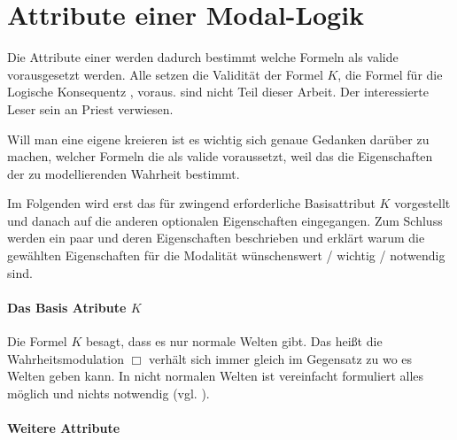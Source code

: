 

\section{Attribute einer Modal-Logik} %
\label{sub:attribute_einer_modal_logik}
Die Attribute einer \ML werden dadurch bestimmt welche Formeln als valide vorausgesetzt werden.
Alle \NML setzen die Validität der Formel $K$, die Formel für die Logische Konsequentz , voraus.
\NNML sind nicht Teil dieser Arbeit. 
Der interessierte Leser sein an Priest  verwiesen.

Will man eine eigene \ML kreieren ist es wichtig sich genaue Gedanken darüber zu machen, welcher Formeln die als valide voraussetzt, weil das die Eigenschaften der zu modellierenden Wahrheit bestimmt.

Im Folgenden wird erst das für \NML zwingend erforderliche Basisattribut $K$ vorgestellt und danach auf die anderen optionalen Eigenschaften eingegangen.
Zum Schluss werden ein paar \NML und deren Eigenschaften beschrieben und erklärt warum die gewählten Eigenschaften für die Modalität wünschenswert / wichtig / notwendig sind.

\paragraph{Das Basis Atribute $K$} %
\label{par:das_basis_atribute_k_} Die Formel $K$ \KFormel besagt, dass es nur normale Welten gibt. Das heißt die Wahrheitsmodulation $\Box$ verhält sich immer gleich im Gegensatz zu \NNML wo es  Welten geben kann.
In nicht normalen Welten ist vereinfacht formuliert alles möglich und nichts notwendig (vgl. \cite[S.75]{Priest:2008}).


\paragraph{Weitere Attribute} %
\label{par:weitere_attribute} 

